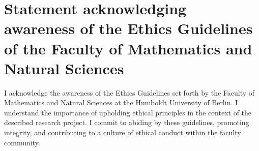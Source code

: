 \documentclass[letterpaper]{article}
\begin{document}
\section{Statement acknowledging awareness of the Ethics Guidelines of the Faculty of Mathematics and Natural Sciences}
I acknowledge the awareness of the Ethics Guidelines set forth by the Faculty of Mathematics and Natural Sciences at the Humboldt University of Berlin. I understand the importance of upholding ethical principles in the context of the described research project. I commit to abiding by these guidelines, promoting integrity, and contributing to a culture of ethical conduct within the faculty community.


\bigskip


\bigskip


\bigskip
\end{document}
